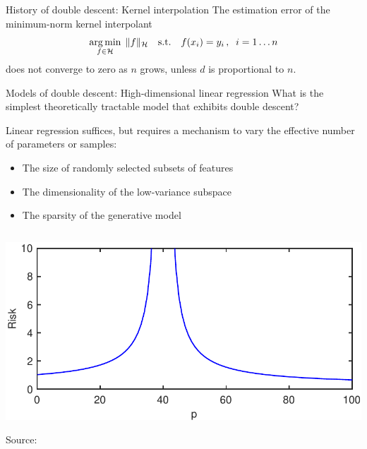 \documentclass[10pt, aspectratio=169]{beamer}
\begin{document}
\begin{frame}{History of double descent: Kernel interpolation}
\qquad The estimation error of the minimum-norm kernel interpolant
$$\operatorname*{{arg\,min}}_{f\in\mathcal{H}}\; \|f\|_\mathcal{H}\quad \text{s.t.} \quad  f(x_i) = y_i\,, \;\; i=1\ldots n$$
\qquad does not converge to zero as $n$ grows, unless $d$ is proportional to $n$.
\end{frame}
\begin{frame}[t]{Models of double descent: High-dimensional linear regression}
What is the simplest theoretically tractable model that exhibits double descent?
\pause

Linear regression suffices, but requires a mechanism to vary the effective number of parameters or samples:
\begin{itemize}
    \item The size of randomly selected subsets of features~\citep{belkin2020two}
    \item The dimensionality of the low-variance subspace~\citep{bartlett2020benign}
    \item The sparsity of the generative model~\citep{mitra2019understanding}
\end{itemize}
\begin{columns}
\begin{column}{0.6\linewidth}
\begin{center}
\includegraphics[width=0.7\linewidth]{part-4-images/riskplot-new.pdf}

\vspace{-0.2cm}
{\scriptsize Source: \citep{belkin2020two}}
\end{center}


\end{column}
\end{columns}
\end{frame}
\end{document}
